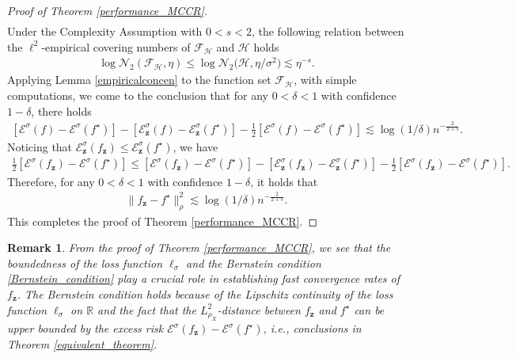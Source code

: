 \documentclass[11pt]{article}
\newtheorem{remark}{Remark}
\begin{document}
\begin{proof}[Proof of Theorem \ref{performance_MCCR}]
\begin{align*}
	\end{align*}
	Under the Complexity Assumption with $0<s<2$, the following relation between the $\ell^2$-empirical covering numbers of $\mathcal{F}_\mathcal{H}$ and $\mathcal{H}$ holds
	\begin{align*}
	\log\mathcal{N}_2(\mathcal{F}_\mathcal{H},\eta)\leq
	\log\mathcal{N}_2\Big(\mathcal{H},\eta/\sigma^2\Big)\lesssim \eta^{-s}.
	\end{align*}
	Applying Lemma \ref{empiricalconcen} to the function set
	$\mathcal{F}_\mathcal{H}$, with simple computations, we come to the conclusion that for any $0<\delta<1$ with confidence $1-\delta$, there holds
	\begin{align*}
	\left[\mathcal{E}^\sigma(f)-\mathcal{E}^\sigma(f^\star)\right]-
	\left[\mathcal{E}^\sigma_\mathbf{z}(f)-\mathcal{E}^\sigma_\mathbf{z}(f^\star)\right]-\frac{1}{2}\left[\mathcal{E}^\sigma(f)-\mathcal{E}^\sigma(f^\star)\right]\lesssim \log(1/\delta)n^{-\frac{2}{2+s}}.
	\end{align*}
	Noticing that $\mathcal{E}_\mathbf{z}^\sigma(f_\mathbf{z})\leq \mathcal{E}_\mathbf{z}^\sigma(f^\star)$, we have
	\begin{align*}
	\frac{1}{2}\left[\mathcal{E}^\sigma(f_\mathbf{z})-\mathcal{E}^\sigma(f^\star)\right]\leq \left[\mathcal{E}^\sigma(f_\mathbf{z})-\mathcal{E}^\sigma(f^\star)\right]-
	\left[\mathcal{E}^\sigma_\mathbf{z}(f_\mathbf{z})-\mathcal{E}^\sigma_\mathbf{z}(f^\star)\right]-\frac{1}{2}\left[\mathcal{E}^\sigma(f_\mathbf{z})-\mathcal{E}^\sigma(f^\star)\right].
	\end{align*}
	Therefore, for any $0<\delta<1$ with confidence $1-\delta$, it holds that
	\begin{align*}
	\|f_\mathbf{z}-f^\star\|_\rho^2\lesssim \log(1/\delta)n^{-\frac{2}{2+s}}.
	\end{align*}
	This completes the proof of Theorem \ref{performance_MCCR}.
\end{proof}

\begin{remark}
	From the proof of Theorem \ref{performance_MCCR}, we see that the boundedness of the loss function $\ell_\sigma$ and the Bernstein condition \eqref{Bernstein_condition} play a crucial role in establishing fast convergence rates of $f_\mathbf{z}$. The Bernstein condition holds because of the Lipschitz continuity of the loss function $\ell_\sigma$ on $\mathbb{R}$ and the fact that the $L_{\rho_X}^2$-distance between $f_\mathbf{z}$ and $f^\star$ can be upper bounded by the excess risk $\mathcal{E}^\sigma(f_\mathbf{z})-\mathcal{E}^\sigma(f^\star)$, i.e., conclusions in Theorem \ref{equivalent_theorem}.     
\end{remark}
\end{document}
